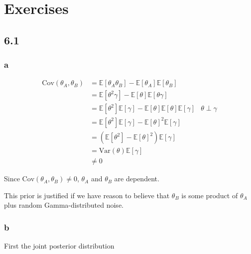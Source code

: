 \documentclass[]{article}
\begin{document}
\hypertarget{exercises}{%
\section{Exercises}\label{exercises}}

\hypertarget{section}{%
\subsection{6.1}\label{section}}

\hypertarget{a}{%
\subsubsection{a}\label{a}}

\[
\begin{align}
\text{Cov}(\theta_A, \theta_B) &= \mathbb{E}\left[\theta_A \theta_B\right] - \mathbb{E}[\theta_A]\mathbb{E}[\theta_B] \\
&= \mathbb{E}[\theta^2\gamma] - \mathbb{E}[\theta] \mathbb{E}[\theta\gamma] \\
&= \mathbb{E}\left[\theta^2\right] \mathbb{E}\left[ \gamma \right] - \mathbb{E}[\theta]\mathbb{E}[\theta]\mathbb{E}[\gamma] & \theta \perp \gamma \\
&= \mathbb{E}\left[\theta^2\right] \mathbb{E}\left[ \gamma \right] - \mathbb{E}[\theta]^2\mathbb{E}[\gamma] \\
&= \left(\mathbb{E}[\theta^2] - \mathbb{E}[\theta]^2 \right) \mathbb{E}[\gamma] \\
&= \text{Var}(\theta) \mathbb{E}[\gamma] \\
&\neq 0
\end{align}
\]

Since \(\text{Cov}(\theta_A, \theta_B) \neq 0\), \(\theta_A\) and
\(\theta_B\) are dependent.

This prior is justified if we have reason to believe that \(\theta_B\)
is some product of \(\theta_A\) plus random Gamma-distributed noise.

\hypertarget{b}{%
\subsubsection{b}\label{b}}

First the joint posterior distribution
\end{document}
